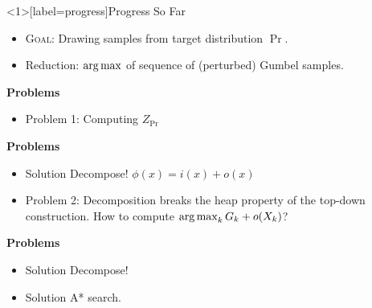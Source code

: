 \begin{frame}<1>[label=progress]{Progress So Far}
  \begin{itemize}[<+->]
  \item \textsc{Goal}: Drawing samples from target distribution $\Pr$.
  \item Reduction: $\operatorname*{{arg\,max}}$ of sequence of (perturbed) Gumbel samples.
  \end{itemize}
  \begin{overprint}

    \textbf{Problems}
    \begin{itemize}
    \item {\color{red}Problem 1:} Computing $Z_{\Pr}$        %
    \end{itemize}

    \textbf{Problems}
    \begin{itemize} 
    \item {\color{blue} Solution} Decompose! $\phi(x) = i(x) + o(x)$%
    \item {\color{red} Problem 2:} Decomposition breaks the heap property of the top-down construction. How to compute $\operatorname*{{arg\,max}}_k G_k + o(X_k)$? %
    \end{itemize}

    \textbf{Problems}
    \begin{itemize} 
    \item {\color{blue} Solution} Decompose! %
    \item {\color{blue} Solution} A* search.
    \end{itemize}
  \end{overprint}
\end{frame}

